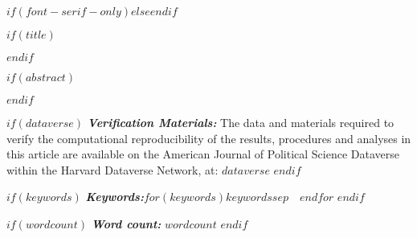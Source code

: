 $if(font-serif-only)$$else$\allsectionsfont{\sffamily}$endif$

$if(title)$
\maketitle
$endif$


$if(abstract)$
\begin{abstract}
$abstract$
\end{abstract}
$endif$

$if(dataverse)$
\textbf{\textit{Verification Materials:}}
The data and materials required to verify the computational reproducibility of the results, procedures and analyses in this article are available on the American Journal of Political Science Dataverse within the Harvard Dataverse Network, at: 
$dataverse$
$endif$

$if(keywords)$
\textbf{\textit{Keywords:}}\quad $for(keywords)$$keywords$$sep$~\textbullet~$endfor$
$endif$

$if(wordcount)$
\textbf{\textit{Word count:}} $wordcount$
$endif$
